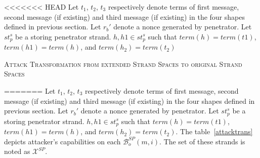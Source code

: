 \begin{Definition}
<<<<<<< HEAD
Let $t_1$, $t_2$, $t_3$ respectively denote terms of first message, second message (if existing) and third message (if existing) in the four shapes defined in previous section. Let $r_b'$ denote a nonce generated by penetrator. Let $st^s_p$ be a storing penetrator strand. $h, h1\in st^s_p$ such that $term(h) = term(t1)$, $term(h1) = term(h)$, and $term(h_2) = term(t_2)$ 

\begin{table}[b]
\centering
\caption{\textsc{Attack Transformation from extended Strand Spaces to original Strand Spaces}}
=======
Let $t_1$, $t_2$, $t_3$ respectively denote terms of first message, second message (if existing) and third message (if existing) in the four shapes defined in previous section. Let $r_b'$ denote a nonce generated by penetrator. Let $st^s_p$ be a storing penetrator strand. $h, h1\in st^s_p$ such that $term(h) = term(t1)$, $term(h1) = term(h)$, and $term(h_2) = term(t_2)$. The table~\ref{attacktrans} depicts attacker's capabilities on each $\mathcal{B}^{SP}_o(m,i)$. The set of these strands is noted as $\mathcal{X}^{SP}$.  


\end{table}
\end{Definition}
